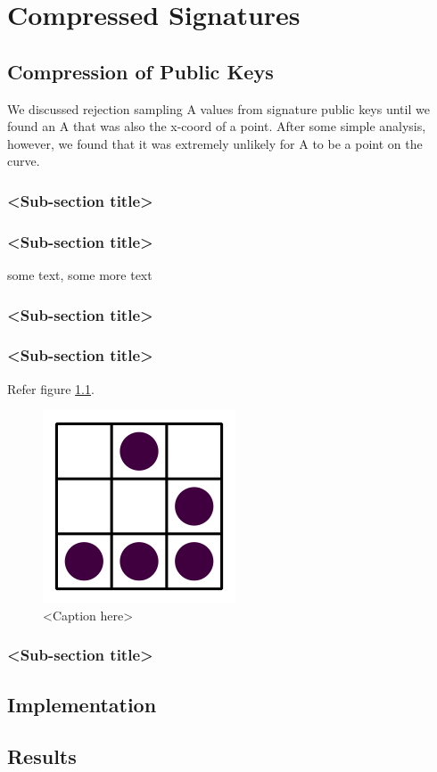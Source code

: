 \chapter{Compressed Signatures}

\section{Compression of Public Keys}

We discussed rejection sampling A values from signature public keys until we found an A that was also the x-coord of a point. After some simple analysis, however, we found that it was extremely unlikely for A to be a point on the curve.\\

\subsection{<Sub-section title>}

\subsection{<Sub-section title>}
some text\cite{citation-2-name-here}, some more text
\subsection{<Sub-section title>}

\subsection{<Sub-section title>}

Refer figure \ref{fig:label}.

\begin{figure}[htb]
\centering
\includegraphics[scale=0.3]{glider} %
\caption{<Caption here>}
\label{fig:label} %
\end{figure}

\subsection{<Sub-section title>}


\section{Implementation}

\section{Results}

